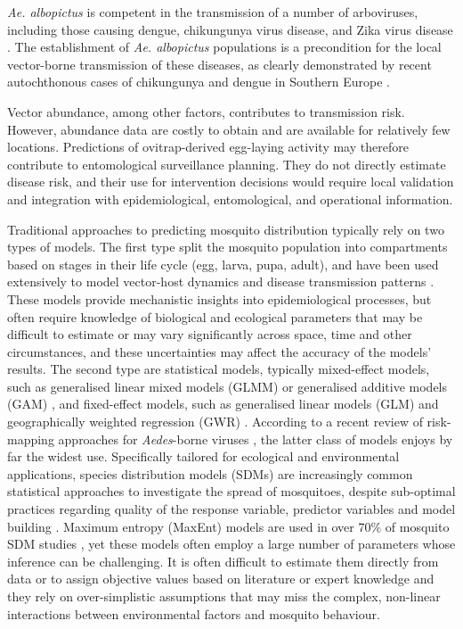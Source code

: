 \documentclass[preprint,12pt]{elsarticle}
\begin{document}
\emph{Ae. albopictus} is competent in the transmission of a number of arboviruses, including those causing dengue, chikungunya virus disease, and Zika virus disease \cite{kraemer2015}. The establishment of \emph{Ae. albopictus} populations is a precondition for the local vector-borne transmission of these diseases, as clearly demonstrated by recent autochthonous cases of chikungunya and dengue in Southern Europe \cite{Rezza2007, Cattaneo2023}. 

Vector abundance, among other factors, contributes to transmission risk. However, abundance data are costly to obtain and are available for relatively few locations. Predictions of ovitrap-derived egg-laying activity may therefore contribute to entomological surveillance planning. They do not directly estimate disease risk, and their use for intervention decisions would require local validation and integration with epidemiological, entomological, and operational information.

Traditional approaches to predicting mosquito distribution typically rely on two types of models. The first type split the mosquito population into compartments based on stages in their life cycle (egg, larva, pupa, adult), and have been used extensively to model vector-host dynamics and disease transmission patterns \cite{guzzetta2016, Kioutsioukis2019,  li2019, tran2020, angelou2021, dare2022, davis2024}. These models provide mechanistic insights into epidemiological processes, but often require  knowledge of biological and ecological parameters that may be difficult to estimate or may vary significantly across space, time and other circumstances, and these uncertainties may affect the accuracy of the models' results. The second type are statistical models, typically mixed-effect models, such as generalised linear mixed models (GLMM) or generalised additive models (GAM) \cite{Barman2025}, and fixed-effect models, such as generalised linear models (GLM) \cite{Stilianakis2016, zardini2024} and geographically weighted regression (GWR) \cite{Yang2021}. According to a recent review of risk-mapping approaches for \emph{Aedes}-borne viruses  \cite{Lim2023}, the latter class of models enjoys by far the widest use. Specifically tailored for ecological and environmental applications,  species distribution models (SDMs) are increasingly common statistical approaches to investigate the spread of mosquitoes, despite sub-optimal practices regarding quality of the response variable, predictor variables and model building \cite{Barker2022}. Maximum entropy (MaxEnt) models are used in over 70\% of mosquito SDM studies \cite{Lippi2023}, yet these models often employ a large number of parameters whose inference can be challenging. It is often difficult to estimate them directly from data or to assign objective values based on literature or expert knowledge and they rely on over-simplistic assumptions that may miss the complex, non-linear interactions between environmental factors and mosquito behaviour.
\end{document}
